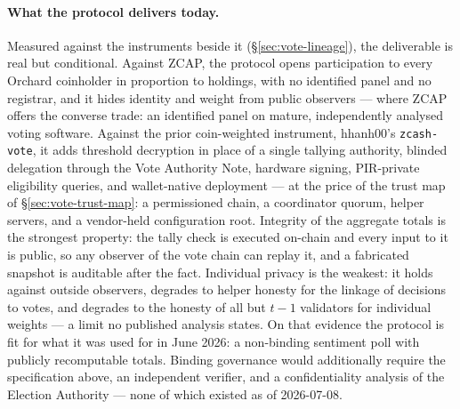 \documentclass[11pt,a4paper]{article}
\theoremstyle{definition}
\begin{document}
\paragraph{What the protocol delivers today.} Measured against the
instruments beside it (\S\ref{sec:vote-lineage}), the deliverable is
real but conditional. Against ZCAP, the protocol opens participation to
every Orchard coinholder in proportion to holdings, with no identified
panel and no registrar, and it hides identity and weight from public
observers --- where ZCAP offers the converse trade: an identified panel
on mature, independently analysed voting software. Against the prior
coin-weighted instrument, hhanh00's \texttt{zcash-vote}, it adds
threshold decryption in place of a single tallying authority, blinded
delegation through the Vote Authority Note, hardware signing,
PIR-private eligibility queries, and wallet-native deployment --- at the
price of the trust map of \S\ref{sec:vote-trust-map}: a permissioned
chain, a coordinator quorum, helper servers, and a vendor-held
configuration root. Integrity of the aggregate totals is the strongest
property: the tally check is executed on-chain and every input to it is
public, so any observer of the vote chain can replay it, and a
fabricated snapshot is auditable after the fact. Individual privacy is
the weakest: it holds against outside observers, degrades to helper
honesty for the linkage of decisions to votes, and degrades to the
honesty of all but $t-1$ validators for individual weights --- a limit no
published analysis states. On that evidence the protocol is fit for
what it was used for in June 2026: a non-binding sentiment poll with
publicly recomputable totals. Binding governance would additionally
require the specification above, an independent verifier, and a
confidentiality analysis of the Election Authority --- none of which
existed as of 2026-07-08.
\end{document}

